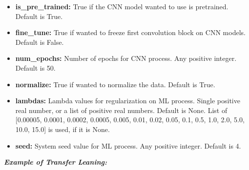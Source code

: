 \begin{itemize}
\item
  \textbf{is\_pre\_trained:} True if the CNN model wanted to use is pretrained.
  Default is True.\\
\item
  \textbf{fine\_tune:} True if wanted to freeze first convolution block on CNN
  models. Default is False.\\
\item
  \textbf{num\_epochs:} Number of epochs for CNN process. Any positive integer.
  Default is 50.\\
\item
  \textbf{normalize:} True if wanted to normalize the data. Default is True.\\
\item
  \textbf{lambdas:} Lambda values for regularization on ML process. Single
  positive real number, or a list of positive real numbers. Default is
  None. List of {[}0.00005, 0.0001, 0.0002, 0.0005, 0.005, 0.01, 0.02,
  0.05, 0.1, 0.5, 1.0, 2.0, 5.0, 10.0, 15.0{]} is used, if it is None.\\
\item
  \textbf{seed:} System seed value for ML process. Any positive integer. Default
  is 4.
\end{itemize}

\textbf{\emph{Example of Transfer Leaning:}}


